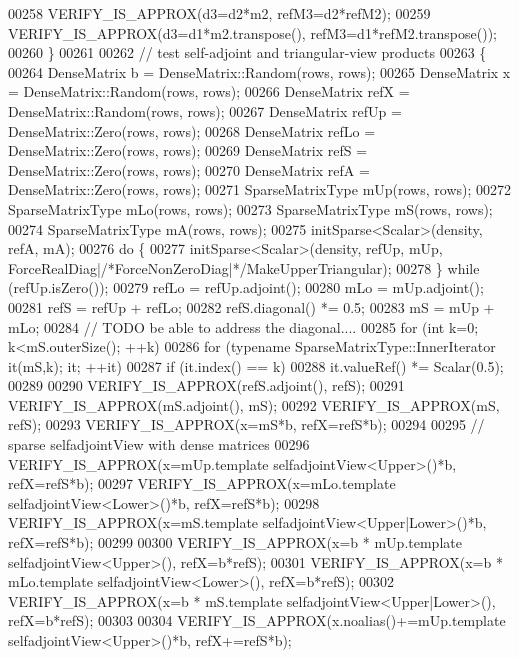 \begin{DoxyCode}
00258     VERIFY\_IS\_APPROX(d3=d2*m2, refM3=d2*refM2);
00259     VERIFY\_IS\_APPROX(d3=d1*m2.transpose(), refM3=d1*refM2.transpose());
00260   \}
00261 
00262   \textcolor{comment}{// test self-adjoint and triangular-view products}
00263   \{
00264     DenseMatrix b = DenseMatrix::Random(rows, rows);
00265     DenseMatrix x = DenseMatrix::Random(rows, rows);
00266     DenseMatrix refX = DenseMatrix::Random(rows, rows);
00267     DenseMatrix refUp = DenseMatrix::Zero(rows, rows);
00268     DenseMatrix refLo = DenseMatrix::Zero(rows, rows);
00269     DenseMatrix refS = DenseMatrix::Zero(rows, rows);
00270     DenseMatrix refA = DenseMatrix::Zero(rows, rows);
00271     SparseMatrixType mUp(rows, rows);
00272     SparseMatrixType mLo(rows, rows);
00273     SparseMatrixType mS(rows, rows);
00274     SparseMatrixType mA(rows, rows);
00275     initSparse<Scalar>(density, refA, mA);
00276     \textcolor{keywordflow}{do} \{
00277       initSparse<Scalar>(density, refUp, mUp, ForceRealDiag|\textcolor{comment}{/*ForceNonZeroDiag|*/}MakeUpperTriangular);
00278     \} \textcolor{keywordflow}{while} (refUp.isZero());
00279     refLo = refUp.adjoint();
00280     mLo = mUp.adjoint();
00281     refS = refUp + refLo;
00282     refS.diagonal() *= 0.5;
00283     mS = mUp + mLo;
00284     \textcolor{comment}{// TODO be able to address the diagonal....}
00285     \textcolor{keywordflow}{for} (\textcolor{keywordtype}{int} k=0; k<mS.outerSize(); ++k)
00286       \textcolor{keywordflow}{for} (\textcolor{keyword}{typename} SparseMatrixType::InnerIterator it(mS,k); it; ++it)
00287         \textcolor{keywordflow}{if} (it.index() == k)
00288           it.valueRef() *= Scalar(0.5);
00289 
00290     VERIFY\_IS\_APPROX(refS.adjoint(), refS);
00291     VERIFY\_IS\_APPROX(mS.adjoint(), mS);
00292     VERIFY\_IS\_APPROX(mS, refS);
00293     VERIFY\_IS\_APPROX(x=mS*b, refX=refS*b);
00294 
00295     \textcolor{comment}{// sparse selfadjointView with dense matrices}
00296     VERIFY\_IS\_APPROX(x=mUp.template selfadjointView<Upper>()*b, refX=refS*b);
00297     VERIFY\_IS\_APPROX(x=mLo.template selfadjointView<Lower>()*b, refX=refS*b);
00298     VERIFY\_IS\_APPROX(x=mS.template selfadjointView<Upper|Lower>()*b, refX=refS*b);
00299 
00300     VERIFY\_IS\_APPROX(x=b * mUp.template selfadjointView<Upper>(),       refX=b*refS);
00301     VERIFY\_IS\_APPROX(x=b * mLo.template selfadjointView<Lower>(),       refX=b*refS);
00302     VERIFY\_IS\_APPROX(x=b * mS.template selfadjointView<Upper|Lower>(),  refX=b*refS);
00303 
00304     VERIFY\_IS\_APPROX(x.noalias()+=mUp.template selfadjointView<Upper>()*b, refX+=refS*b);

\end{DoxyCode}

